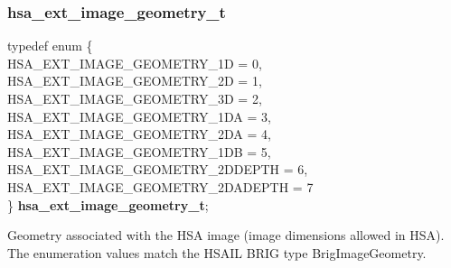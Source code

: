 \documentclass[final,oneside]{book}
\newcommand{\reftyp}[1]{#1}
\newcommand{\refenu}[1]{\reftyp{#1}}
\newenvironment{mylongtable}{\rowcolors{0}{lightgray}{lightgray}\longtable} {
\endlongtable}
\begin{document}
\subsubsection{hsa_\-ext_\-image_\-geometry_\-t}
\vspace{-5.5mm}\begin{mylongtable}{@{}p{\textwidth}}
\rule{0pt}{3ex}typedef enum \{\\\hspace{1.7em}\hypertarget{group__ext-images_1ggac61587d98a80d1660378e3904a66fc9caa025ea993dbfe3101d3ff0caea2ea0cf}{\refenu{HSA_\-EXT_\-IMAGE_\-GEOMETRY_\-1D}} = 0,\\
\hspace{1.7em}\hypertarget{group__ext-images_1ggac61587d98a80d1660378e3904a66fc9ca4bcc28ccad5a32bd9c9dbf203da4464e}{\refenu{HSA_\-EXT_\-IMAGE_\-GEOMETRY_\-2D}} = 1,\\
\hspace{1.7em}\hypertarget{group__ext-images_1ggac61587d98a80d1660378e3904a66fc9ca2e749b6b96377b9a744fc837296e318c}{\refenu{HSA_\-EXT_\-IMAGE_\-GEOMETRY_\-3D}} = 2,\\
\hspace{1.7em}\hypertarget{group__ext-images_1ggac61587d98a80d1660378e3904a66fc9cad989c8e619b376dc98ac3950be9afa33}{\refenu{HSA_\-EXT_\-IMAGE_\-GEOMETRY_\-1DA}} = 3,\\
\hspace{1.7em}\hypertarget{group__ext-images_1ggac61587d98a80d1660378e3904a66fc9ca90929e69cbf0b447060e1aeb23fd6dd4}{\refenu{HSA_\-EXT_\-IMAGE_\-GEOMETRY_\-2DA}} = 4,\\
\hspace{1.7em}\hypertarget{group__ext-images_1ggac61587d98a80d1660378e3904a66fc9ca47b208990ed715c37071f1fff17e812c}{\refenu{HSA_\-EXT_\-IMAGE_\-GEOMETRY_\-1DB}} = 5,\\
\hspace{1.7em}\hypertarget{group__ext-images_1ggac61587d98a80d1660378e3904a66fc9caf1f195107c114c7235275f047d2f0474}{\refenu{HSA_\-EXT_\-IMAGE_\-GEOMETRY_\-2DDEPTH}} = 6,\\
\hspace{1.7em}\hypertarget{group__ext-images_1ggac61587d98a80d1660378e3904a66fc9caf3d5440659a9dfd7892da13c1fe992bd}{\refenu{HSA_\-EXT_\-IMAGE_\-GEOMETRY_\-2DADEPTH}} = 7\\
\} \hypertarget{group__ext-images_1gac61587d98a80d1660378e3904a66fc9c}{\textbf{hsa_\-ext_\-image_\-geometry_\-t}};\rule[-2ex]{0pt}{0pt}\end{mylongtable}
\vspace{-5mm}Geometry associated with the HSA image (image dimensions allowed in HSA). The enumeration values match the HSAIL BRIG type BrigImageGeometry.
\end{document}
